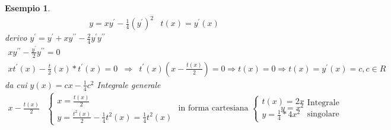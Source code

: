 \documentclass{book}
\newtheorem{esempio}{Esempio}
\begin{document}
\begin{enumerate}
\begin{esempio}
                  \begin{eqnarray*}
                    y=xy^\prime-\frac{1}{4}(y^\prime)^2 & t(x)=y^\prime(x)
                  \end{eqnarray*}
                  derivo $y^\prime=y^\prime+xy^{\prime\prime}-\frac{2}{4}y^\prime
                  y^{\prime\prime}$
                  \begin{eqnarray*}
                    xy^{\prime\prime}-\frac{y^\prime}{2}y^{\prime\prime}=0\\
                    xt^\prime (x)-\frac{t}{2}(x)*t^\prime(x)=0
                    &\Rightarrow&t^\prime(x)\left(x-\frac{t(x)}{2}\right)=0\Rightarrow
                                  t(x)=0\Rightarrow t(x)=y^\prime(x)=c, c\in R
                  \end{eqnarray*}
                  da cui $y(x)=cx-\frac{1}{4}c^2$ Integrale generale\\
                  \begin{eqnarray*}
                    x-\frac{t(x)}{2} & \begin{cases}
                                         x=\frac{t(x)}{2}\\
                                         y=\frac{t^2(x)}{2}-\frac{1}{4}t^2(x)=\frac{1}{4}t^2(x)
                                       \end{cases}
                                       \text{ in forma cartesiana } \begin{cases}
                                                                      t(x)=2x\\
                                                                      y=\frac{1}{4}*4x^2
                                                                    \end{cases}
                    & y=x^2   \begin{matrix}
                                \text{Integrale}\\
                                \text{singolare}
                              \end{matrix}
                  \end{eqnarray*}
                \end{esempio}
\end{enumerate}
\clearpage
\end{document}
